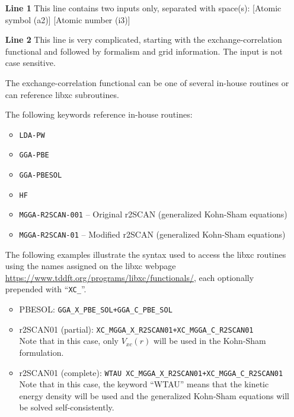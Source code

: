 \documentclass[11pt]{article}
\begin{document}
\begin{itemize}
	\item[{\bf{Line 1}}]   This line contains two inputs only, separated
		with  space(s):   [Atomic symbol (a2)]    [Atomic number (i3)]
	\item[{\bf{Line 2}}]   This line is very complicated, starting with
		the exchange-correlation functional and followed by formalism
		and grid information.  The input is not case sensitive.

		The exchange-correlation functional can be one of several
		in-house routines or can reference libxc subroutines.

		The following keywords reference in-house routines:
		\begin{itemize}
			\item \verb+LDA-PW+
			\item \verb+GGA-PBE+
			\item \verb+GGA-PBESOL+
			\item \verb+HF+
			\item \verb+MGGA-R2SCAN-001+ -- Original r2SCAN (generalized Kohn-Sham equations)
			\item \verb+MGGA-R2SCAN-01+ -- Modified r2SCAN (generalized Kohn-Sham equations)
		\end{itemize}
		
		The following examples illustrate the syntax  used to access the libxc
		 routines using
		the names assigned on the libxc webpage
		\url{https://www.tddft.org/programs/libxc/functionals/}, each optionally
		prepended with  ``\verb+XC_+''.
		\begin{itemize}
			\item PBESOL:  \verb^GGA_X_PBE_SOL+GGA_C_PBE_SOL^
			\item r2SCAN01 (partial): \verb^XC_MGGA_X_R2SCAN01+XC_MGGA_C_R2SCAN01^\\
			   Note that in this case, only $V_{xc}(r)$ will be used in
			   the Kohn-Sham formulation.
			\item r2SCAN01 (complete): 
			\verb^WTAU XC_MGGA_X_R2SCAN01+XC_MGGA_C_R2SCAN01^\\
			   Note that in this case, the keyword ``WTAU'' means that the kinetic
			   energy density will be used and the generalized Kohn-Sham equations
			    will be solved self-consistently.
		\end{itemize}
		

\end{itemize}
\end{document}
